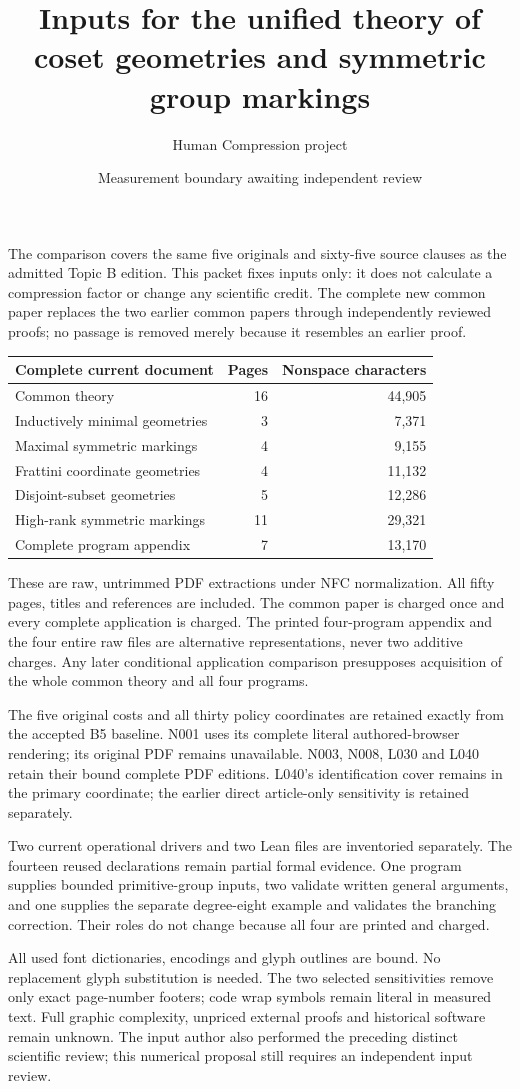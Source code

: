 \documentclass[11pt,a4paper]{article}
\title{Inputs for the unified theory of coset geometries and symmetric group markings}
\author{Human Compression project}\date{Measurement boundary awaiting independent review}
\begin{document}
\maketitle
The comparison covers the same five originals and sixty-five source clauses as the admitted Topic B edition. This packet fixes inputs only: it does not calculate a compression factor or change any scientific credit. The complete new common paper replaces the two earlier common papers through independently reviewed proofs; no passage is removed merely because it resembles an earlier proof.

\begin{center}\begin{tabular}{lrr}\toprule
Complete current document & Pages & Nonspace characters\\\midrule
Common theory &16&44,905\\
Inductively minimal geometries &3&7,371\\
Maximal symmetric markings &4&9,155\\
Frattini coordinate geometries &4&11,132\\
Disjoint-subset geometries &5&12,286\\
High-rank symmetric markings &11&29,321\\
Complete program appendix &7&13,170\\\bottomrule
\end{tabular}\end{center}
These are raw, untrimmed PDF extractions under NFC normalization. All fifty pages, titles and references are included. The common paper is charged once and every complete application is charged. The printed four-program appendix and the four entire raw files are alternative representations, never two additive charges. Any later conditional application comparison presupposes acquisition of the whole common theory and all four programs.

The five original costs and all thirty policy coordinates are retained exactly from the accepted B5 baseline. N001 uses its complete literal authored-browser rendering; its original PDF remains unavailable. N003, N008, L030 and L040 retain their bound complete PDF editions. L040's identification cover remains in the primary coordinate; the earlier direct article-only sensitivity is retained separately.

Two current operational drivers and two Lean files are inventoried separately. The fourteen reused declarations remain partial formal evidence. One program supplies bounded primitive-group inputs, two validate written general arguments, and one supplies the separate degree-eight example and validates the branching correction. Their roles do not change because all four are printed and charged.

All used font dictionaries, encodings and glyph outlines are bound. No replacement glyph substitution is needed. The two selected sensitivities remove only exact page-number footers; code wrap symbols remain literal in measured text. Full graphic complexity, unpriced external proofs and historical software remain unknown. The input author also performed the preceding distinct scientific review; this numerical proposal still requires an independent input review.
\end{document}
